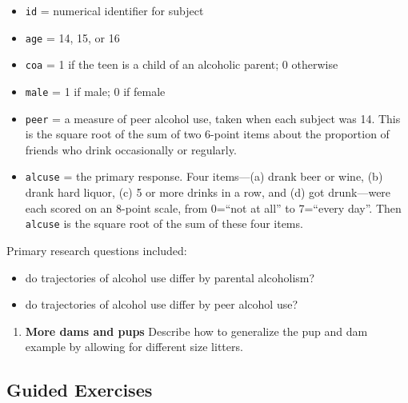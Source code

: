 \documentclass[
]{krantz}
\providecommand{\tightlist}{%
  \setlength{\itemsep}{0pt}\setlength{\parskip}{0pt}}
\begin{document}
\begin{enumerate}
  \begin{itemize}
  \tightlist
  \item
    \texttt{id} = numerical identifier for subject
  \item
    \texttt{age} = 14, 15, or 16
  \item
    \texttt{coa} = 1 if the teen is a child of an alcoholic parent; 0 otherwise
  \item
    \texttt{male} = 1 if male; 0 if female
  \item
    \texttt{peer} = a measure of peer alcohol use, taken when each subject was 14. This is the square root of the sum of two 6-point items about the proportion of friends who drink occasionally or regularly.
  \item
    \texttt{alcuse} = the primary response. Four items---(a) drank beer or wine, (b) drank hard liquor, (c) 5 or more drinks in a row, and (d) got drunk---were each scored on an 8-point scale, from 0=``not at all'' to 7=``every day''. Then \texttt{alcuse} is the square root of the sum of these four items.
  \end{itemize}

  Primary research questions included:

  \begin{itemize}
  \tightlist
  \item
    do trajectories of alcohol use differ by parental alcoholism?
  \item
    do trajectories of alcohol use differ by peer alcohol use?
  \end{itemize}
\end{enumerate}

\begin{enumerate}
\def\labelenumi{\arabic{enumi}.}
\setcounter{enumi}{1}
\tightlist
\item
  \textbf{More dams and pups} Describe how to generalize the pup and dam example by allowing for different size litters.
\end{enumerate}

\hypertarget{guided-exercises-5}{%
\subsection{Guided Exercises}\label{guided-exercises-5}}
\end{document}
